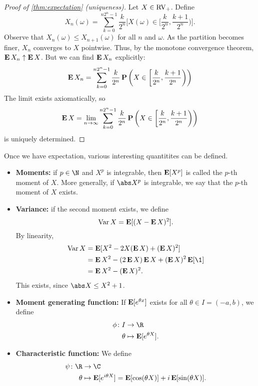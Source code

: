 \begin{proof}[Proof of \cref{thm:expectation} (uniqueness)]
    Let $X \in \operatorname{RV}_+$.
    Define \[
        X_n(\omega) = \sum_{k=0}^{n2^n-1} \frac{k}{2^n}
        \Big[X(\omega) \in \Big[\frac{k}{2^n}, \frac{k+1}{2^n}\Big)\Big].
    \]
    Observe that $X_n(\omega) \le X_{n+1}(\omega)$ for all $n$ and $\omega$.
    As the partition becomes finer, $X_n$ converges to $X$ pointwise.
    Thus, by the monotone convergence theorem, $\operatorname{\mathbf E} X_n \uparrow \operatorname{\mathbf E} X$.
    But we can find $\operatorname{\mathbf E} X_n$ explicitly:
    \[
        \operatorname{\mathbf E} X_n = \sum_{k=0}^{n2^n-1} \frac{k}{2^n}
        \operatorname{\mathbf P}\left(X \in \left[\frac{k}{2^n}, \frac{k+1}{2^n}\right)\right)
    \] The limit exists axiomatically, so
    \[
        \operatorname{\mathbf E} X = \lim_{n \to \infty} \sum_{k=0}^{n2^n-1} \frac{k}{2^n}
        \operatorname{\mathbf P}\left(X \in \left[\frac{k}{2^n}, \frac{k+1}{2^n}\right)\right)
    \] is uniquely determined.
\end{proof}

Once we have expectation, various interesting quantitites can be defined.
\begin{itemize}
    \item \textbf{Moments:} if $p \in \N$ and $X^p$ is integrable, then
        $\operatorname{\mathbf E}[X^p]$ is called the $p$-th moment of $X$.
        More generally, if $\abs X^p$ is integrable, we say
        that the $p$-th moment of $X$ exists.
    \item \textbf{Variance:} if the second moment exists, we define \[
        \operatorname{Var} X = \operatorname{\mathbf E}[(X - \operatorname{\mathbf E} X)^2].
    \] By linearity, \begin{align*}
        \Var X &= \E[X^2 - 2 X (\E X) + (\E X)^2] \\
            &= \E X^2 - (2 \E X) \E X + (\E X)^2 \E[\1{}] \\
            &= \E X^2 - (\E X)^2.
    \end{align*}
    This exists, since $\abs X \le X^2 + 1$.
    \item \textbf{Moment generating function:} If $\operatorname{\mathbf E}[e^{\theta x}]$
        exists for all $\theta \in I = (-a, b)$, we define \begin{align*}
            \phi\colon I &\to \R \\
            \theta &\mapsto \E[e^{\theta X}].
        \end{align*}
    \item \textbf{Characteristic function:} We define \begin{align*}
            \psi\colon \R &\to \C \\
            \theta &\mapsto \E[e^{i\theta X}]
                = \E[\cos(\theta X)] + i \E[\sin(\theta X)].
        \end{align*}
\end{itemize}

